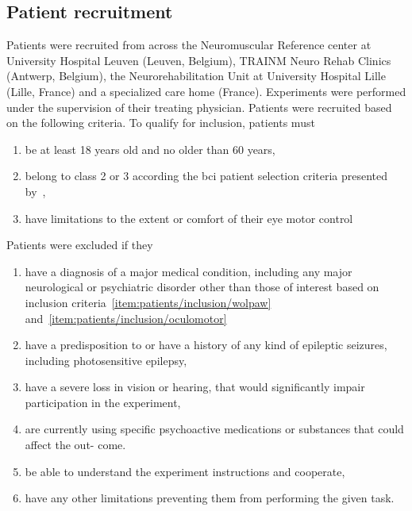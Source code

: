 \subsection{Patient recruitment}
Patients were recruited from across the Neuromuscular Reference center at
University Hospital Leuven (Leuven, Belgium), TRAINM Neuro Rehab Clinics
(Antwerp, Belgium), the Neurorehabilitation Unit at University Hospital Lille
(Lille, France) and a specialized care home (France).
Experiments were performed under the supervision of their treating physician.
Patients were recruited based on the following criteria.
To qualify for inclusion, patients must
\begin{enumerate}
	\item be at least 18 years old and no older than 60
	years,
  \item belong to class 2 or 3 according the \ac{bci}
	patient selection criteria presented by~\textcite{Wolpaw2006},\label{item:patients/inclusion/wolpaw}
  \item have limitations to the extent or comfort of their eye motor control\label{item:patients/inclusion/oculomotor}
\end{enumerate}
Patients were excluded if they
\begin{enumerate}
  \item have a diagnosis of a major medical condition, including any major
    neurological or psychiatric disorder other than those of interest based on
    inclusion criteria~\ref{item:patients/inclusion/wolpaw}
    and~\ref{item:patients/inclusion/oculomotor}\label{item:patients/exclusion/medical}
  \item have a predisposition to or have a history of any kind of epileptic seizures,
    including photosensitive epilepsy,\label{item:patients/exclusion/epilepsy}
  \item have a severe loss in vision or hearing, that would significantly impair
        participation in the experiment,\label{item:patients/exclusion/vision}
  \item are currently using specific psychoactive medications or substances that could affect the out-
        come.\label{item:patients/exclusion/cognitive}
  \item be able to understand the experiment instructions and cooperate,
  \item have any other limitations preventing them from performing the given task.
\end{enumerate}

